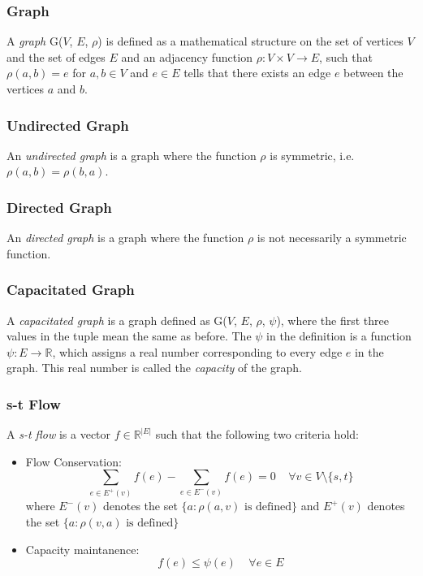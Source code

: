 \documentclass[BTech]{iitmdiss}
\begin{document}
      \subsubsection{Graph}
      A \textit{graph} G($V$, $E$, $\rho$) is defined as a mathematical structure on the set of vertices $V$ and the set of edges $E$ and an adjacency
      function $\rho : V \times V \rightarrow E$, such that $\rho(a,b) = e$ for $a,b \in V$ and $e \in E$ tells that there exists an edge $e$ between 
      the vertices $a$ and $b$.
      
      \subsubsection{Undirected Graph}
	An \textit{undirected graph} is a graph where the function $\rho$ is symmetric, i.e. $\rho(a,b) = \rho(b,a)$.
 
      \subsubsection{Directed Graph}
	An \textit{directed graph} is a graph where the function $\rho$ is not necessarily a symmetric function.
	
      \subsubsection{Capacitated Graph}
	A \textit{capacitated graph} is a graph defined as G($V$, $E$, $\rho$, $\psi$), where the first three values in the tuple mean the same as before.
	The $\psi$ in the definition is a function $\psi: E \rightarrow \mathbb{R}$, which assigns a real number corresponding to every edge $e$ in the 
	graph. This real number is called the \textit{capacity} of the graph.
      
      \subsubsection{s-t Flow}
	A \textit{s-t flow} is a vector $f \in \mathbb{R}^{|E|}$ such that the following two criteria hold:
	\begin{itemize}
	 \item 
	   Flow Conservation: $$\displaystyle\sum_{e \in E^+(v)} f(e)- \displaystyle\sum_{e \in E^-(v)} f(e) = 0 ~~~~~ \forall v \in V \setminus \{s,t\}$$
	   where $E^-(v)$ denotes the set $\{a: \rho(a,v) \text{ is defined}\}$ and $E^+(v)$ denotes the set $\{a: \rho(v,a) \text{ is defined}\}$
	 \item
	  Capacity maintanence:
	    $$f(e) \leq \psi(e)~~~~~\forall e \in E$$
	      
	\end{itemize}
	
\end{document}

